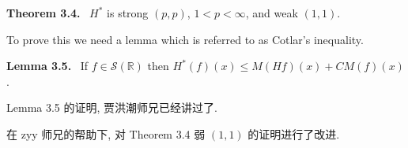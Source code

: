 \documentclass[a4paper,11pt]{article}
\theoremstyle{definition}
\begin{document}
\begin{framed}
    \vspace{0.2cm}
    \noindent\textbf{Theorem 3.4.} $ \, $ $ H^* $ is strong $ (p,p) $, $ 1 < p < \infty $, and weak $ (1,1) $.
    \vspace{0.3cm}
    
    To prove this we need a lemma which is referred to as Cotlar's inequality.
    
    \vspace{0.2cm}
    \noindent\textbf{Lemma 3.5.} $ \, $ If $ f \in \mathcal{S}(\mathbb{R}) $ then 
    $ H^* (f) (x) \leq M(Hf)(x) + CM(f)(x) $.
\end{framed}

Lemma 3.5 的证明, 贾洪潮师兄已经讲过了.

在 zyy 师兄的帮助下, 对 Theorem 3.4 弱 $ (1, 1) $ 的证明进行了改进.
\end{document}
